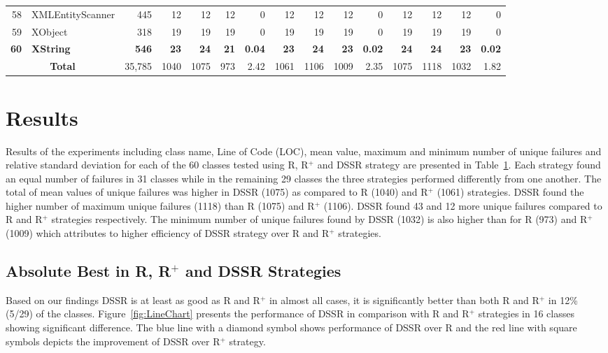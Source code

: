 \begin{table} [htp!]
{\begin{tabularx}{1 \textwidth}{r l r r r r r r r r r r r r r}
58						& XMLEntityScanner			&445		& 12		&	12	&	12	& 	0					& 12		&  12		& 12		& 		0			& 12			& 12			& 12			&	0\\      
59						& XObject					&318		& 19		&	19	&	19	& 	0					& 19		&  19		& 19		& 		0			& 19			& 19			& 19			&	0\\      
\textbf{60}						& \textbf{XString}					&\textbf{546}		& \textbf{23}		&	\textbf{24}	&	\textbf{21}	& 	\textbf{0.04}					& \textbf{23}		&  \textbf{24}		& \textbf{23}		& 		\textbf{0.02}			& \textbf{24}			& \textbf{24}			& \textbf{23}			&	\textbf{0.02}\\      

    						\multicolumn{2}{c}{\textbf{Total}}	&35,785	&1040	&	1075	&    973	&	2.42				& 1061	&1106	&1009	&		2.35		& 1075		& 1118		& 1032		& 	1.82\\
     \end{tabularx} }
    \bigskip
    \label{table:Results}
\end{table}

\section{Results}\label{sec:res}
Results of the experiments including class name, Line of Code (LOC), mean value, maximum and minimum number of unique failures and relative standard deviation for each of the 60 classes tested using R, R$^+$ and DSSR strategy are presented in Table~\ref{table:Results}. Each strategy found an equal number of failures in 31 classes while in the remaining 29 classes the three strategies performed differently from one another. The total of mean values of unique failures was higher in DSSR (1075) as compared to R (1040) and R$^+$ (1061) strategies. 
DSSR found the higher number of maximum unique failures (1118) than R (1075) and R$^+$ (1106). DSSR found 43 and 12 more unique failures compared to R and R$^+$ strategies respectively. The minimum number of unique failures found by DSSR (1032) is also higher than for R (973) and R$^+$ (1009) which attributes to higher efficiency of DSSR strategy over R and R$^+$ strategies. 


\subsection{Absolute Best in R, R$^+$ and DSSR Strategies}
Based on our findings DSSR is at least as good as R and R$^+$ in almost all cases, it is significantly better than both R and R$^+$ in 12\% (5/29) of the classes. Figure~\ref{fig:LineChart} presents the performance of DSSR in comparison with R and R$^+$ strategies in 16 classes showing significant difference. The blue line with a diamond symbol shows performance of DSSR over R and the red line with square symbols depicts the improvement of DSSR over R$^+$ strategy. 

